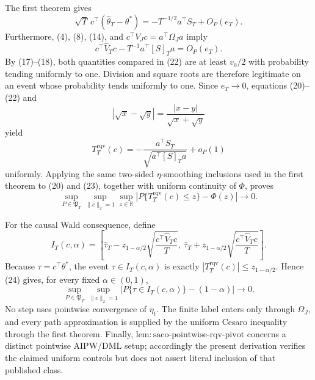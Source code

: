 The first theorem gives
\[
 \sqrt T\,c^\top(\widehat\theta_T-\theta^*)
 =-T^{-1/2}a^\top S_T+O_P(e_T). \tag{21}
\]
Furthermore, (4), (8), (14), and \(c^\top V_Jc=a^\top\Omega_Ja\) imply
\[
 c^\top\widehat V_Tc-T^{-1}a^\top[S]_Ta=O_P(e_T). \tag{22}
\]
By (17)--(18), both quantities compared in (22) are at least \(v_0/2\) with probability tending uniformly to one. Division and square roots are therefore legitimate on an event whose probability tends uniformly to one. Since \(e_T\to0\), equations (20)--(22) and
\[
 |\sqrt x-\sqrt y|=\frac{|x-y|}{\sqrt x+\sqrt y}
\]
yield
\[
 T_T^{\mathrm{rqv}}(c)
 =-\frac{a^\top S_T}{\sqrt{a^\top[S]_Ta}}+o_P(1) \tag{23}
\]
uniformly. Applying the same two-sided \(\eta\)-smoothing inclusions used in the first theorem to (20) and (23), together with uniform continuity of \(\Phi\), proves
\[
 \sup_{P\in\mathfrak P_T}\sup_{\|c\|_2=1}\sup_{z\in\mathbb R}
 \left|P\{T_T^{\mathrm{rqv}}(c)\le z\}-\Phi(z)\right|\longrightarrow0. \tag{24}
\]

For the causal Wald consequence, define
\[
 I_T(c,\alpha)=\left[\widehat\tau_T-z_{1-\alpha/2}
 \sqrt{\frac{c^\top\widehat V_Tc}{T}},\ 
 \widehat\tau_T+z_{1-\alpha/2}
 \sqrt{\frac{c^\top\widehat V_Tc}{T}}\right].
\]
Because \(\tau=c^\top\theta^*\), the event \(\tau\in I_T(c,\alpha)\) is exactly \(|T_T^{\mathrm{rqv}}(c)|\le z_{1-\alpha/2}\). Hence (24) gives, for every fixed \(\alpha\in(0,1)\),
\[
 \sup_{P\in\mathfrak P_T}\sup_{\|c\|_2=1}
 \left|P\{\tau\in I_T(c,\alpha)\}-(1-\alpha)\right|\longrightarrow0. \tag{25}
\]
No step uses pointwise convergence of \(\eta_t\). The finite label enters only through \(\Omega_J\), and every path approximation is supplied by the uniform Cesaro inequality through the first theorem. Finally, \(\mathrm{lem:saco\text{-}pointwise\text{-}rqv\text{-}pivot}\) concerns a distinct pointwise AIPW/DML setup; accordingly the present derivation verifies the claimed uniform controls but does not assert literal inclusion of that published class.